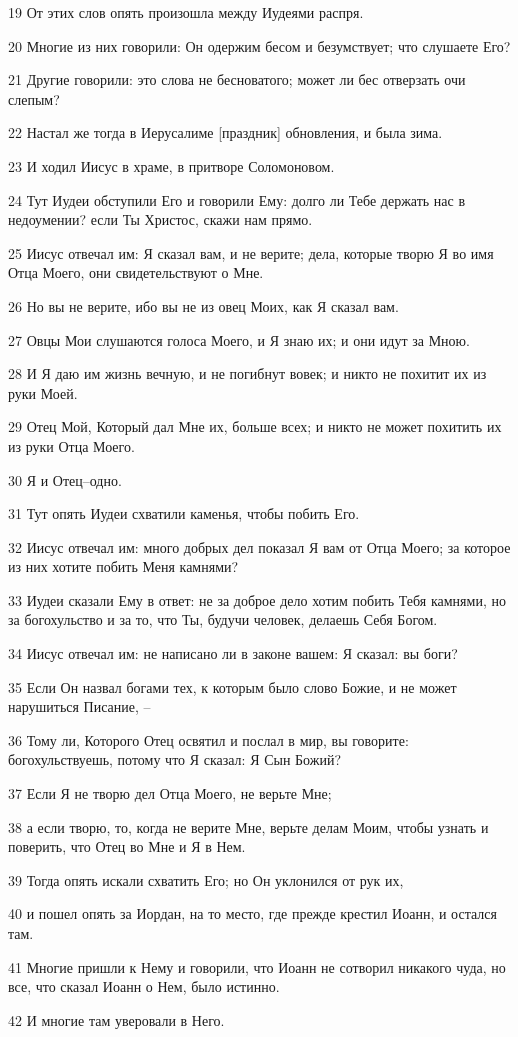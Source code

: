 \par 19 От этих слов опять произошла между Иудеями распря.
\par 20 Многие из них говорили: Он одержим бесом и безумствует; что слушаете Его?
\par 21 Другие говорили: это слова не бесноватого; может ли бес отверзать очи слепым?
\par 22 Настал же тогда в Иерусалиме [праздник] обновления, и была зима.
\par 23 И ходил Иисус в храме, в притворе Соломоновом.
\par 24 Тут Иудеи обступили Его и говорили Ему: долго ли Тебе держать нас в недоумении? если Ты Христос, скажи нам прямо.
\par 25 Иисус отвечал им: Я сказал вам, и не верите; дела, которые творю Я во имя Отца Моего, они свидетельствуют о Мне.
\par 26 Но вы не верите, ибо вы не из овец Моих, как Я сказал вам.
\par 27 Овцы Мои слушаются голоса Моего, и Я знаю их; и они идут за Мною.
\par 28 И Я даю им жизнь вечную, и не погибнут вовек; и никто не похитит их из руки Моей.
\par 29 Отец Мой, Который дал Мне их, больше всех; и никто не может похитить их из руки Отца Моего.
\par 30 Я и Отец--одно.
\par 31 Тут опять Иудеи схватили каменья, чтобы побить Его.
\par 32 Иисус отвечал им: много добрых дел показал Я вам от Отца Моего; за которое из них хотите побить Меня камнями?
\par 33 Иудеи сказали Ему в ответ: не за доброе дело хотим побить Тебя камнями, но за богохульство и за то, что Ты, будучи человек, делаешь Себя Богом.
\par 34 Иисус отвечал им: не написано ли в законе вашем: Я сказал: вы боги?
\par 35 Если Он назвал богами тех, к которым было слово Божие, и не может нарушиться Писание, --
\par 36 Тому ли, Которого Отец освятил и послал в мир, вы говорите: богохульствуешь, потому что Я сказал: Я Сын Божий?
\par 37 Если Я не творю дел Отца Моего, не верьте Мне;
\par 38 а если творю, то, когда не верите Мне, верьте делам Моим, чтобы узнать и поверить, что Отец во Мне и Я в Нем.
\par 39 Тогда опять искали схватить Его; но Он уклонился от рук их,
\par 40 и пошел опять за Иордан, на то место, где прежде крестил Иоанн, и остался там.
\par 41 Многие пришли к Нему и говорили, что Иоанн не сотворил никакого чуда, но все, что сказал Иоанн о Нем, было истинно.
\par 42 И многие там уверовали в Него.

